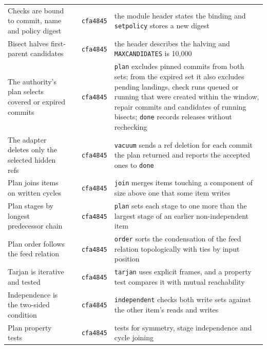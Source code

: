 \documentclass[11pt,letterpaper]{article}
\theoremstyle{definition}
\theoremstyle{remark}
\DeclareRobustCommand{\code}[1]{{\def\_{\textunderscore\allowbreak}\texttt{#1}}}
\begin{document}
\begin{small}
\begin{longtable}{@{}L{3.4cm}L{5.0cm}L{1.3cm}L{5.0cm}@{}}
Checks are bound to commit, name and policy digest &  & \code{cfa4845} & the module header states the binding and \code{set\_policy} stores a new digest \\
Bisect halves first-parent candidates &  & \code{cfa4845} & the header describes the halving and \code{MAX\_CANDIDATES} is 10,000 \\
The authority's plan selects covered or expired commits &  & \code{cfa4845} & \code{plan} excludes pinned commits from both sets; from the expired set it also excludes pending landings, check runs queued or running that were created within the window, repair commits and candidates of running bisects; \code{done} records releases without rechecking \\
The adapter deletes only the selected hidden refs &  & \code{cfa4845} & \code{vacuum} sends a ref deletion for each commit the plan returned and reports the accepted ones to \code{done} \\
Plan joins items on written cycles &  & \code{cfa4845} & \code{join} merges items touching a component of size above one that some item writes \\
Plan stages by longest predecessor chain &  & \code{cfa4845} & \code{plan} sets each stage to one more than the largest stage of an earlier non-independent item \\
Plan order follows the feed relation &  & \code{cfa4845} & \code{order} sorts the condensation of the feed relation topologically with ties by input position \\
Tarjan is iterative and tested &  & \code{cfa4845} & \code{tarjan} uses explicit frames, and a property test compares it with mutual reachability \\
Independence is the two-sided condition &  & \code{cfa4845} & \code{independent} checks both write sets against the other item's reads and writes \\
Plan property tests &  & \code{cfa4845} & tests for symmetry, stage independence and cycle joining \\

\end{longtable}
\end{small}
\end{document}
